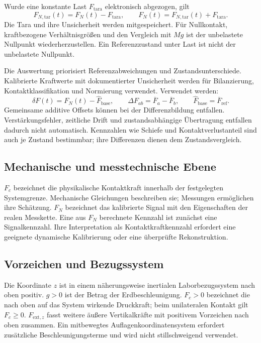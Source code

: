 \documentclass[11pt,a4paper]{article}
\begin{document}
Wurde eine konstante Last $F_{\mathrm{tara}}$ elektronisch abgezogen, gilt
\begin{equation}
F_{N,\mathrm{tar}}(t)=F_N(t)-F_{\mathrm{tara}},\qquad F_N(t)=F_{N,\mathrm{tar}}(t)+F_{\mathrm{tara}}.
\label{eq:tara}
\end{equation}
Die Tara und ihre Unsicherheit werden mitgespeichert. Für Nullkontakt, kraftbezogene Verhältnisgrößen und den Vergleich mit $Mg$ ist der unbelastete Nullpunkt wiederherzustellen. Ein Referenzzustand unter Last ist nicht der unbelastete Nullpunkt.

Die Auswertung priorisiert Referenzabweichungen und Zustandsunterschiede. Kalibrierte Kraftwerte mit dokumentierter Unsicherheit werden für Bilanzierung, Kontaktklassifikation und Normierung verwendet. Verwendet werden:
\begin{equation}
\delta F(t)=F_N(t)-\hat F_{\mathrm{base}},\qquad
\Delta F_{ab}=\overline F_a-\overline F_b,\qquad
\hat F_{\mathrm{base}}=\overline F_{\mathrm{ref}}.
\label{eq:differenzen}
\end{equation}
Gemeinsame additive Offsets können bei der Differenzbildung entfallen. Verstärkungsfehler, zeitliche Drift und zustandsabhängige Übertragung entfallen dadurch nicht automatisch. Kennzahlen wie Schiefe und Kontaktverlustanteil sind auch je Zustand bestimmbar; ihre Differenzen dienen dem Zustandsvergleich.

\subsection{Mechanische und messtechnische Ebene}
$F_c$ bezeichnet die physikalische Kontaktkraft innerhalb der festgelegten Systemgrenze. Mechanische Gleichungen beschreiben sie; Messungen ermöglichen ihre Schätzung. $F_N$ bezeichnet das kalibrierte Signal mit den Eigenschaften der realen Messkette. Eine aus $F_N$ berechnete Kennzahl ist zunächst eine Signalkennzahl. Ihre Interpretation als Kontaktkraftkennzahl erfordert eine geeignete dynamische Kalibrierung oder eine überprüfte Rekonstruktion.

\subsection{Vorzeichen und Bezugssystem}
Die Koordinate $z$ ist in einem näherungsweise inertialen Laborbezugssystem nach oben positiv. $g>0$ ist der Betrag der Erdbeschleunigung. $F_c>0$ bezeichnet die nach oben auf das System wirkende Druckkraft; beim unilateralen Kontakt gilt $F_c\ge0$. $F_{\mathrm{ext},z}$ fasst weitere äußere Vertikalkräfte mit positivem Vorzeichen nach oben zusammen. Ein mitbewegtes Auflagenkoordinatensystem erfordert zusätzliche Beschleunigungsterme und wird nicht stillschweigend verwendet.
\end{document}
